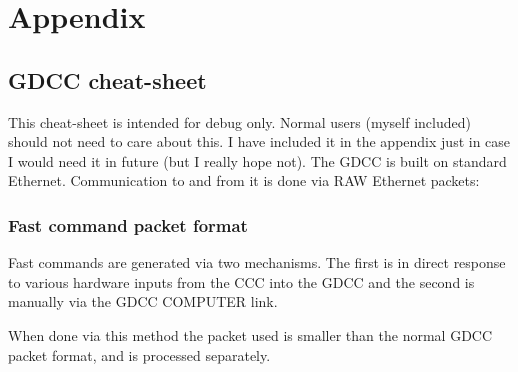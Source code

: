 \chapter{Appendix}
\section{GDCC cheat-sheet}\label{sec:gdcc-cheat-sheet}
This cheat-sheet is intended for debug only. Normal users (myself
included) should not need to care about this. I have included it in
the appendix just in case I would need it in future (but I really hope
not). The GDCC is built on standard Ethernet. Communication to and from it
is done via RAW Ethernet packets:
\subsection{Fast command packet format}
Fast commands are generated via two mechanisms. The first is in direct
response to various hardware inputs from the CCC into the GDCC and the
second is manually via the GDCC \textrightarrow COMPUTER link.

When done via this method the packet used is smaller than the normal
GDCC packet format, and is processed separately.
\begin{table}[ht]
  \centering {}
  \caption{Fast command packet format}
\end{table}

